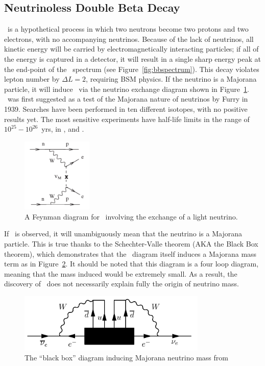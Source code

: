 \documentclass[/main.tex]{subfiles}
\begin{document}
\subsection{Neutrinoless Double Beta Decay}
\znbb\ is a hypothetical process in which two neutrons become two protons and two electrons, with no accompanying neutrinos.
Because of the lack of neutrinos, all kinetic energy will be carried by electromagnetically interacting particles; if all of the energy is captured in a detector, it will result in a single sharp energy peak at the end-point of the \tnbb\ spectrum (see Figure~\ref{fig:bbspectrum}).
This decay violates lepton number by $\Delta L=2$, requiring BSM physics.
If the neutrino is a Majorana particle, it will induce \znbb\ via the neutrino exchange diagram shown in Figure~\ref{fig:bbdiagram}.
\znbb\ was first suggested as a test of the Majorana nature of neutrinos by Furry in 1939\cite{Furry1939}.
Searches have been performed in ten different isotopes, with no positive results yet.
The most sensitive experiments have half-life limits in the range of $10^{25}-10^{26}$~yrs, in \cite{kamlandzen}, \cite{gerda2018} and \cite{Cuore2018}.
\begin{figure}[t]
  \centering
  \includegraphics[width=0.3\textwidth]{znbbDiagramLNE}
  \caption[\znbb\ Decay Diagram]{\label{fig:bbdiagram}
    A Feynman diagram for \znbb\ involving the exchange of a light neutrino.
  }
\end{figure}

If \znbb\ is observed, it will unambiguously mean that the neutrino is a Majorana particle.
This is true thanks to the Schechter-Valle theorem (AKA the Black Box theorem), which demonstrates that the \znbb\ diagram itself induces a Majorana mass term as in Figure~\ref{fig:blackbox}\cite{Schechter1982}.
It should be noted that this diagram is a four loop diagram, meaning that the mass induced would be extremely small.
As a result, the discovery of \znbb\ does not necessarily explain fully the origin of neutrino mass.
\begin{figure}[t]
  \centering
  \includegraphics[width=0.8\textwidth]{blackboxdiagram}
  \caption[\znbb\ Decay Diagram]{\label{fig:blackbox}
    The ``black box'' diagram inducing Majorana neutrino mass from \znbb
  }
\end{figure}
\end{document}
